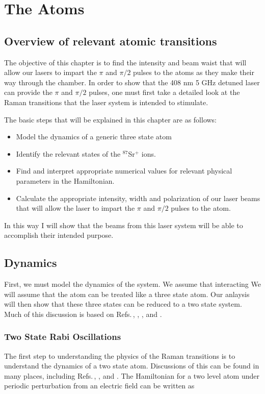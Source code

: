 \chapter{The Atoms} \label{ChapterAboutTheAtoms}
\section{Overview of relevant atomic transitions}

The objective of this chapter is to find the intensity and beam waist that will allow our lasers to impart the $\pi$ and $\pi/2$ pulses to the atoms as they make their way through the chamber. In order to show that the 408 nm 5 GHz detuned laser can provide the $\pi$ and $\pi/2$ pulses, one must first take a detailed look at the Raman transitions that the laser system is intended to stimulate.

The basic steps that will be explained in this chapter are as follows:
\begin{itemize}
\item Model the dynamics of a generic three state atom
\item Identify the relevant states of the $^{87}$Sr$^+$ ions.
\item Find and interpret appropriate numerical values for relevant physical parameters in the Hamiltonian.
\item Calculate the appropriate intensity, width and polarization of our laser beams that will allow the laser to impart the $\pi$ and $\pi/2$ pulses to the atom. 
\end{itemize}
In this way I will show that the beams from this laser system will be able to accomplish their intended purpose.

\section{Dynamics}\label{dynamicsSection}

First, we must model the dynamics of the system. We assume that interacting We will assume that the atom can be treated like a three state atom. Our anlaysis will then show that these three states can be reduced to a two state system. Much of this discussion is based on Refs.\,\cite{Young1997363}, \cite{gustavsonThesis}, \cite{footAtomicPhysics}, \cite{cjeDiss} and \cite{RamanBeamSplit}. 
\subsection{Two State Rabi Oscillations}
The first step to understanding the physics of the Raman transitions is to understand the dynamics of a two state atom. Discussions of this can be found in many places, including Refs.\,\cite{cohenTannoudji}, \cite{demilleBudkerKimball}, and \cite{Young1997363}. The Hamiltonian for a two level atom under periodic perturbation from an electric field can be written as 

